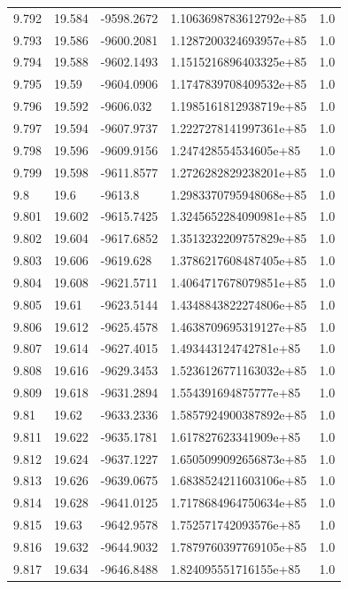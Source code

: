 \begin{tabular}{lllll}
9.792 & 19.584 & -9598.2672 & 1.1063698783612792e+85 & 1.0 \\
9.793 & 19.586 & -9600.2081 & 1.1287200324693957e+85 & 1.0 \\
9.794 & 19.588 & -9602.1493 & 1.1515216896403325e+85 & 1.0 \\
9.795 & 19.59 & -9604.0906 & 1.1747839708409532e+85 & 1.0 \\
9.796 & 19.592 & -9606.032 & 1.1985161812938719e+85 & 1.0 \\
9.797 & 19.594 & -9607.9737 & 1.2227278141997361e+85 & 1.0 \\
9.798 & 19.596 & -9609.9156 & 1.247428554534605e+85 & 1.0 \\
9.799 & 19.598 & -9611.8577 & 1.2726282829238201e+85 & 1.0 \\
9.8 & 19.6 & -9613.8 & 1.2983370795948068e+85 & 1.0 \\
9.801 & 19.602 & -9615.7425 & 1.3245652284090981e+85 & 1.0 \\
9.802 & 19.604 & -9617.6852 & 1.3513232209757829e+85 & 1.0 \\
9.803 & 19.606 & -9619.628 & 1.3786217608487405e+85 & 1.0 \\
9.804 & 19.608 & -9621.5711 & 1.4064717678079851e+85 & 1.0 \\
9.805 & 19.61 & -9623.5144 & 1.4348843822274806e+85 & 1.0 \\
9.806 & 19.612 & -9625.4578 & 1.4638709695319127e+85 & 1.0 \\
9.807 & 19.614 & -9627.4015 & 1.493443124742781e+85 & 1.0 \\
9.808 & 19.616 & -9629.3453 & 1.5236126771163032e+85 & 1.0 \\
9.809 & 19.618 & -9631.2894 & 1.554391694875777e+85 & 1.0 \\
9.81 & 19.62 & -9633.2336 & 1.5857924900387892e+85 & 1.0 \\
9.811 & 19.622 & -9635.1781 & 1.617827623341909e+85 & 1.0 \\
9.812 & 19.624 & -9637.1227 & 1.6505099092656873e+85 & 1.0 \\
9.813 & 19.626 & -9639.0675 & 1.6838524211603106e+85 & 1.0 \\
9.814 & 19.628 & -9641.0125 & 1.7178684964750634e+85 & 1.0 \\
9.815 & 19.63 & -9642.9578 & 1.752571742093576e+85 & 1.0 \\
9.816 & 19.632 & -9644.9032 & 1.7879760397769105e+85 & 1.0 \\
9.817 & 19.634 & -9646.8488 & 1.824095551716155e+85 & 1.0 \\

\end{tabular}
